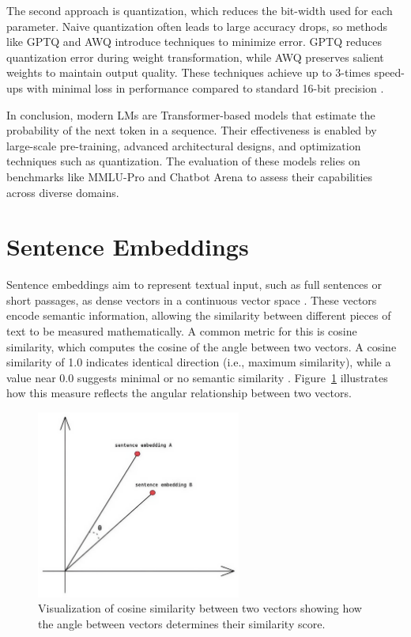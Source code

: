 \documentclass[a4paper,oneside,bibliography=totoc]{scrbook}
\begin{document}
The second approach is quantization, which reduces the bit-width used for each parameter. Naive quantization often leads to large accuracy drops, so methods like GPTQ and AWQ introduce techniques to minimize error. GPTQ reduces quantization error during weight transformation, while AWQ preserves salient weights to maintain output quality. These techniques achieve up to 3-times speed-ups with minimal loss in performance compared to standard 16-bit precision \cite{Frantar2023,Lin2024}.

In conclusion, modern \acp{LM} are Transformer-based models that estimate the probability of the next token in a sequence. Their effectiveness is enabled by large-scale pre-training, advanced architectural designs, and optimization techniques such as quantization. The evaluation of these models relies on benchmarks like MMLU-Pro and Chatbot Arena to assess their capabilities across diverse domains.

\section{Sentence Embeddings}
\label{sec:sentence_embeddings}

Sentence embeddings aim to represent textual input, such as full sentences or short passages, as dense vectors in a continuous vector space \cite{Singhal2001}. These vectors encode semantic information, allowing the similarity between different pieces of text to be measured mathematically. A common metric for this is cosine similarity, which computes the cosine of the angle between two vectors. A cosine similarity of 1.0 indicates identical direction (i.e., maximum similarity), while a value near 0.0 suggests minimal or no semantic similarity \cite{Singhal2001}. Figure~\ref{fig:cosine_similarity} illustrates how this measure reflects the angular relationship between two vectors.

\begin{figure}[t]
  \centering
  \includegraphics[width=0.6\textwidth]{figures/cosine_similarity.jpeg}
  \caption[Visualization of cosine similarity between two vectors showing how the angle between vectors determines their similarity score]{Visualization of cosine similarity between two vectors showing how the angle between vectors determines their similarity score. \cite{Leys2022}}
  \label{fig:cosine_similarity}
\end{figure}
\end{document}
